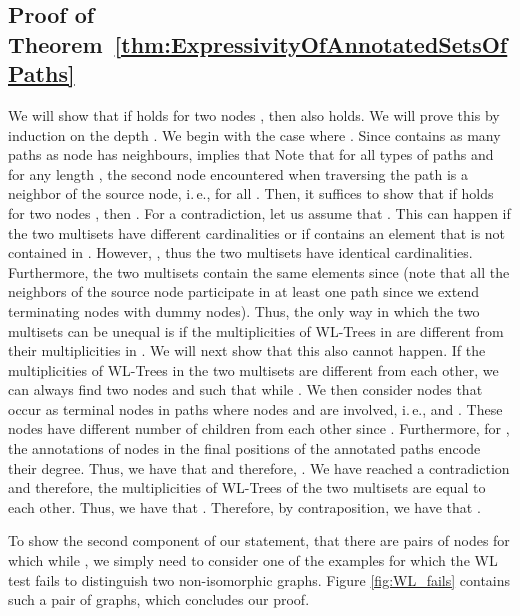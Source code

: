 \documentclass{article}
\theoremstyle{plain}
\theoremstyle{definition}
\theoremstyle{remark}
\newcommand{\ie}{i.\,e., }
\begin{document}
\subsection{Proof of Theorem~\ref{thm:ExpressivityOfAnnotatedSetsOfPaths}}
We will show that if  holds for two nodes , then  also holds.
We will prove this by induction on the depth .
We begin with the case where .
Since  contains as many paths as node  has neighbours,  implies that  
Note that for all types of paths and for any length , the second node encountered when traversing the path is a neighbor of the source node, \ie  for all .
Then, it suffices to show that if  holds for two nodes , then .
For a contradiction, let us assume that .
This can happen if the two multisets have different cardinalities or if  contains an element that is not contained in .
However, , thus the two multisets have identical cardinalities.
Furthermore, the two multisets contain the same elements since  (note that all the neighbors of the source node participate in at least one path since we extend terminating nodes with dummy nodes).
Thus, the only way in which the two multisets can be unequal is if the multiplicities of WL-Trees in   are different from their multiplicities in .
We will next show that this also cannot happen.
If the multiplicities of WL-Trees in the two multisets are different from each other, we can always find two nodes  and  such that  while .
We then consider nodes that occur as terminal nodes in paths where nodes  and  are involved, \ie  and .
These nodes have different number of children from each other since .
Furthermore, for , the annotations of nodes in the final positions of the annotated paths encode their degree.
Thus, we have that  and therefore, .
We have reached a contradiction and therefore, the multiplicities of WL-Trees of the two multisets are equal to each other.
Thus, we have that .
Therefore, by contraposition, we have that . 

To show the second component of our statement, that there are pairs of nodes  for which  while , we simply need to consider one of the examples for which the WL test fails to distinguish two non-isomorphic graphs.
Figure \ref{fig:WL_fails} contains such a pair of graphs, which concludes our proof.  
\end{document}
